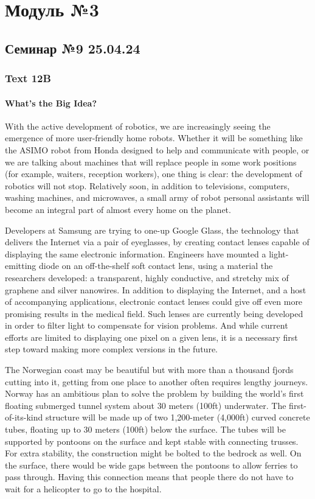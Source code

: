 \part{Модуль №3}

\chapter{Семинар №9 25.04.24}

\section{Text 12B}

\subsection*{What’s the Big Idea?}
 With the active development of robotics, we are increasingly seeing the emergence of more user-friendly home robots. Whether it will be something like the ASIMO robot from Honda designed to help and communicate with people, or we are talking about machines that will replace people in some work positions (for example, waiters, reception workers), one thing is clear: the development of robotics will not stop. Relatively soon, in addition to televisions, computers, washing machines, and microwaves, a small army of robot personal assistants will become an integral part of almost every home on the planet.

 Developers at Samsung are trying to one-up Google Glass, the technology that delivers the Internet via a pair of eyeglasses, by creating contact lenses capable of displaying the same electronic information. Engineers have mounted a light-emitting diode on an off-the-shelf soft contact lens, using a material the researchers developed: a transparent, highly conductive, and stretchy mix of graphene and silver nanowires. In addition to displaying the Internet, and a host of accompanying applications, electronic contact lenses could give off even more promising results in the medical field. Such lenses are currently being developed in order to filter light to compensate for vision problems. And while current efforts are limited to displaying one pixel on a given lens, it is a necessary first step toward making more complex versions in the future.

 The Norwegian coast may be beautiful but with more than a thousand fjords cutting into it, getting from one place to another often requires lengthy journeys. Norway has an ambitious plan to solve the problem by building the world’s first floating submerged tunnel system about 30 meters (100ft) underwater. The first-of-its-kind structure will be made up of two 1,200-meter (4,000ft) curved concrete tubes, floating up to 30 meters (100ft) below the surface. The tubes will be supported by pontoons on the surface and kept stable with connecting trusses. For extra stability, the construction might be bolted to the bedrock as well. On the surface, there would be wide gaps between the pontoons to allow ferries to pass through. Having this connection means that people there do not have to wait for a helicopter to go to the hospital.

